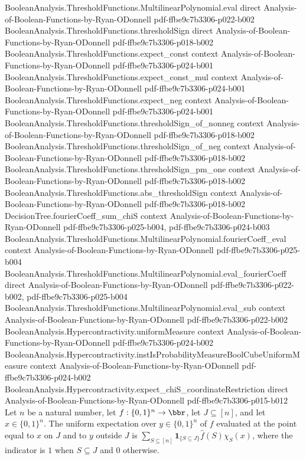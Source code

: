 \begin{lemma}
\proofstep
  {BooleanAnalysis.ThresholdFunctions.MultilinearPolynomial.eval}
  {direct}
  {Analysis-of-Boolean-Functions-by-Ryan-ODonnell}
  {pdf-ffbe9c7b3306-p022-b002}
\proofstep
  {BooleanAnalysis.ThresholdFunctions.thresholdSign}
  {direct}
  {Analysis-of-Boolean-Functions-by-Ryan-ODonnell}
  {pdf-ffbe9c7b3306-p018-b002}
\proofstep
  {BooleanAnalysis.ThresholdFunctions.expect_const}
  {context}
  {Analysis-of-Boolean-Functions-by-Ryan-ODonnell}
  {pdf-ffbe9c7b3306-p024-b001}
\proofstep
  {BooleanAnalysis.ThresholdFunctions.expect_const_mul}
  {context}
  {Analysis-of-Boolean-Functions-by-Ryan-ODonnell}
  {pdf-ffbe9c7b3306-p024-b001}
\proofstep
  {BooleanAnalysis.ThresholdFunctions.expect_neg}
  {context}
  {Analysis-of-Boolean-Functions-by-Ryan-ODonnell}
  {pdf-ffbe9c7b3306-p024-b001}
\proofstep
  {BooleanAnalysis.ThresholdFunctions.thresholdSign_of_nonneg}
  {context}
  {Analysis-of-Boolean-Functions-by-Ryan-ODonnell}
  {pdf-ffbe9c7b3306-p018-b002}
\proofstep
  {BooleanAnalysis.ThresholdFunctions.thresholdSign_of_neg}
  {context}
  {Analysis-of-Boolean-Functions-by-Ryan-ODonnell}
  {pdf-ffbe9c7b3306-p018-b002}
\proofstep
  {BooleanAnalysis.ThresholdFunctions.thresholdSign_pm_one}
  {context}
  {Analysis-of-Boolean-Functions-by-Ryan-ODonnell}
  {pdf-ffbe9c7b3306-p018-b002}
\proofstep
  {BooleanAnalysis.ThresholdFunctions.abs_thresholdSign}
  {context}
  {Analysis-of-Boolean-Functions-by-Ryan-ODonnell}
  {pdf-ffbe9c7b3306-p018-b002}
\proofstep
  {DecisionTree.fourierCoeff_sum_chiS}
  {context}
  {Analysis-of-Boolean-Functions-by-Ryan-ODonnell}
  {pdf-ffbe9c7b3306-p025-b004,
    pdf-ffbe9c7b3306-p024-b003}
\proofstep
  {BooleanAnalysis.ThresholdFunctions.MultilinearPolynomial.fourierCoeff_eval}
  {context}
  {Analysis-of-Boolean-Functions-by-Ryan-ODonnell}
  {pdf-ffbe9c7b3306-p025-b004}
\proofstep
  {BooleanAnalysis.ThresholdFunctions.MultilinearPolynomial.eval_fourierCoeff}
  {direct}
  {Analysis-of-Boolean-Functions-by-Ryan-ODonnell}
  {pdf-ffbe9c7b3306-p022-b002,
    pdf-ffbe9c7b3306-p025-b004}
\proofstep
  {BooleanAnalysis.ThresholdFunctions.MultilinearPolynomial.eval_sub}
  {context}
  {Analysis-of-Boolean-Functions-by-Ryan-ODonnell}
  {pdf-ffbe9c7b3306-p022-b002}
\proofstep
  {BooleanAnalysis.Hypercontractivity.uniformMeasure}
  {context}
  {Analysis-of-Boolean-Functions-by-Ryan-ODonnell}
  {pdf-ffbe9c7b3306-p024-b002}
\proofstep
  {BooleanAnalysis.Hypercontractivity.instIsProbabilityMeasureBoolCubeUniformMeasure}
  {context}
  {Analysis-of-Boolean-Functions-by-Ryan-ODonnell}
  {pdf-ffbe9c7b3306-p024-b002}
\proofstep
  {BooleanAnalysis.Hypercontractivity.expect_chiS_coordinateRestriction}
  {direct}
  {Analysis-of-Boolean-Functions-by-Ryan-ODonnell}
  {pdf-ffbe9c7b3306-p015-b012}
Let $n$ be a natural number, let $f:\{0,1\}^n\to\bbr$, let $J\subseteq[n]$, and let
$x\in\{0,1\}^n$. The uniform expectation over $y\in\{0,1\}^n$ of $f$ evaluated at the
point equal to $x$ on $J$ and to $y$ outside $J$ is
$\displaystyle\sum_{S\subseteq[n]}\mathbf{1}_{\{S\subseteq J\}}\widehat f(S)\chi_S(x)$,
where the indicator is $1$ when $S\subseteq J$ and $0$ otherwise.
\end{lemma}


